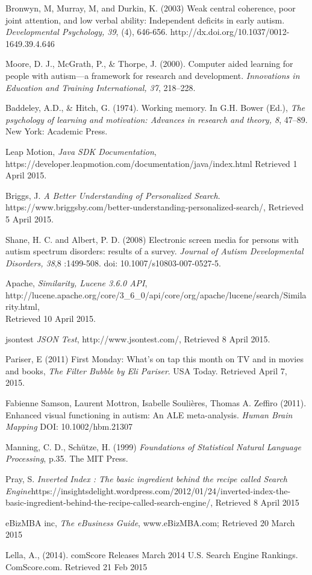 \documentclass[a4paper, 10pt]{article}
\begin{document}
\begin{thebibliography}{100}
 Bronwyn, M, Murray, M, and Durkin, K. (2003) Weak central coherence, poor joint attention, and low verbal ability: Independent deficits in early autism. \textit{Developmental Psychology, 39}, (4), 646-656. http://dx.doi.org/10.1037/0012-1649.39.4.646

Moore, D. J., McGrath, P., \& Thorpe, J. (2000). Computer aided learning for people with autism—a framework for research and development. \textit{Innovations in Education and Training International, 37}, 218–228.

Baddeley, A.D., \& Hitch, G. (1974). Working memory. In G.H. Bower (Ed.), \textit{The psychology of learning and motivation: Advances in research and theory, 8}, 47–89. New York: Academic Press.

 Leap Motion, \textit{Java SDK Documentation}, \\https://developer.leapmotion.com/documentation/java/index.html Retrieved 1 April 2015.

Briggs, J. \textit{A Better Understanding of Personalized Search}. https://www.briggsby.com/better-understanding-personalized-search/, Retrieved 5 April 2015.

Shane, H. C. and Albert, P. D. (2008) Electronic screen media for persons with autism spectrum disorders: results of a survey. \textit{Journal of Autism Developmental Disorders, 38},8 :1499-508. doi: 10.1007/s10803-007-0527-5.

 Apache, \textit{Similarity, Lucene 3.6.0 API},  \\http://lucene.apache.org/core/3\_6\_0/api/core/org/apache/lucene/search/Similarity.html, \\Retrieved 10 April 2015.

jsontest \textit{JSON Test}, http://www.jsontest.com/, Retrieved 8 April 2015.

 Pariser, E (2011) First Monday: What's on tap this month on TV and in movies and books, \textit{The Filter Bubble by Eli Pariser}. USA Today. Retrieved April 7, 2015. 

Fabienne Samson, Laurent Mottron, Isabelle Soulières, Thomas A. Zeffiro (2011). Enhanced visual functioning in autism: An ALE meta-analysis. \textit{Human Brain Mapping} DOI: 10.1002/hbm.21307

Manning, C. D., Schütze, H. (1999) \textit{Foundations of Statistical Natural Language Processing}, p.35. The MIT Press.

 Pray, S. \textit{Inverted Index : The basic ingredient behind the recipe called Search Engine}https://insightsdelight.wordpress.com/2012/01/24/inverted-index-the-basic-ingredient-behind-the-recipe-called-search-engine/, Retrieved 8 April 2015

eBizMBA inc, \textit{The eBusiness Guide}, www.eBizMBA.com; Retrieved 20 March 2015

Lella, A., (2014). comScore Releases March 2014 U.S. Search Engine Rankings. ComScore.com. Retrieved 21 Feb 2015

\end{thebibliography}
\end{document}
